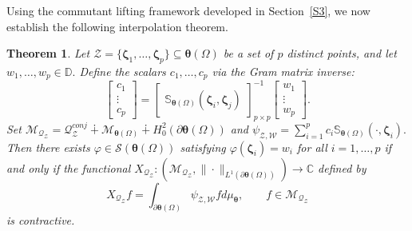 \documentclass[12pt,reqno]{amsart}
\newtheorem{theorem}{Theorem}[section]
\theoremstyle{remark}
\theoremstyle{definition}
\def \\theta{\boldsymbol{\theta}}
\def \\xi{\boldsymbol{\xi}}
\begin{document}
Using the commutant lifting framework developed in Section~\ref{S3}, we now establish the following interpolation theorem.
\begin{theorem}\label{interpolation 1st}
    Let $\mathcal{Z}=\{\boldsymbol \zeta_1,\ldots,\boldsymbol \zeta_p\}\subseteq \boldsymbol \theta(\Omega)$ be a set of $p$ distinct points, and let $w_1,\ldots,w_p\in \mathbb D.$
Define the scalars $c_1,\ldots,c_p$ via the Gram matrix inverse:
    $$\begin{bmatrix}
            c_1 \\  \vdots\\ c_p 
        \end{bmatrix}= {\begin{bmatrix}
            \mathbb S_{\boldsymbol \theta(\Omega)}(\boldsymbol \zeta_i, \boldsymbol \zeta_j)
        \end{bmatrix}}_{p\times p}^{-1} \begin{bmatrix}
            w_1 \\ \vdots \\w_p
        \end{bmatrix}.$$
    Set $\mathcal{M}_{\mathcal{Q}_{\mathcal{Z}}}=\mathcal{Q}_{\mathcal{Z}}^{conj} \dotplus \mathcal{M}_{\boldsymbol \theta(\Omega)}\dotplus H^2_{0}(\partial\boldsymbol \theta(\Omega))$ and $\psi_{\mathcal{Z}, \mathcal{W}}=\sum_{i=1}^p c_i \mathbb S_{\boldsymbol \theta(\Omega)}(\cdot, \boldsymbol \zeta_i). $ 
    Then there exists $\varphi\in \mathcal{S}(\boldsymbol \theta(\Omega))$ satisfying $\varphi(\boldsymbol \zeta_i)=w_i$ for all $i=1,\ldots,p$ if and only if the functional $X_{\mathcal{Q_{\mathcal{Z}}}}: \left(\mathcal{M}_{\mathcal{Q}_{\mathcal{Z}}}, \|\cdot \|_{L^1(\partial\boldsymbol \theta(\Omega))}\right) \to \mathbb C$ defined by $$X_{\mathcal{Q_{\mathcal{Z}}}} f=\int_{\partial\boldsymbol \theta(\Omega)} \psi_{\mathcal{Z}, \mathcal{W}} fd\mu_{\boldsymbol \theta}, \qquad f\in \mathcal{M}_{\mathcal{Q}_{\mathcal{Z}}}$$ is contractive.
     \end{theorem}
   
\end{document}
